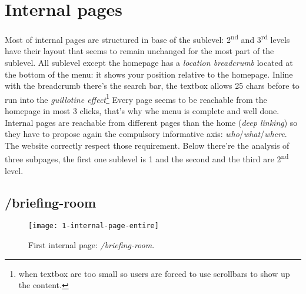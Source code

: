 \documentclass[
12pt, %
a4paper, %
oneside, %
headinclude,footinclude, %
BCOR5mm, %
]{scrartcl}
\begin{document}

\section{Internal pages}
Most of internal pages are structured in base of the sublevel: 2\textsuperscript{nd} and 3\textsuperscript{rd} levels have their layout that seems to remain unchanged for the most part of the sublevel.
All sublevel except the homepage has a \emph{location breadcrumb} located at the bottom of the menu: it shows your position relative to the homepage. Inline with the breadcrumb there's the search bar, the textbox allows 25 chars before to run into the \emph{guillotine effect}\footnote{when textbox are too small so users are forced to use scrollbars to show up the content.}
Every page seems to be reachable from the homepage in most 3 clicks, that's why whe menu is complete and well done. 
Internal pages are reachable from different pages than the home (\emph{deep linking}) so they have to propose again the compulsory informative axis: \emph{who}/\emph{what}/\emph{where}. The website correctly respect those requirement.
Below there're the analysis of three subpages, the first one sublevel is 1 and the second and the third are 2\textsuperscript{nd} level.

	\subsection{/briefing-room}
	

	\begin{figure}[h!]
	\centering 
	\centerline{\texttt{[image: 1-internal-page-entire]}}
	\caption[First internal page: /briefing-room]{First internal page: \emph{/briefing-room}.}
	\label{fig:primapaginainterna} 
	\end{figure}
\end{document}
